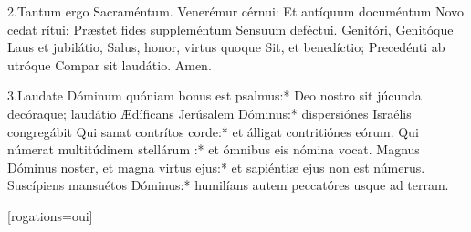 \documentclass[%
fontsize=11%
,a5paper%
,DIV=15%
]{scrartcl}
\title{\centrer{\huge{Procession des Rogations}}}
\def\gretextformat#1{{\fontsize{\taillepolice}{\taillepolice}\selectfont #1}}
\def\greinitialformat#1{{\lettrines #1}}
\begin{document}

{2.Tantum ergo Sacraméntum.
Venerémur cérnui:
Et antíquum documéntum
Novo cedat rítui:
Præstet fides suppleméntum
Sensuum deféctui.
Genitóri, Genitóque
Laus et jubilátio,
Salus, honor, virtus quoque
Sit, et benedíctio;
Precedénti ab utróque
Compar sit laudátio. Amen.}

{3.Laudate Dóminum quóniam bonus est
psalmus:* Deo nostro sit júcunda decóraque;
laudátio
Ædíficans Jerúsalem Dóminus:* dispersiónes
Israélis congregábit
Qui sanat contrítos corde:* et álligat contritiónes
eórum.
Qui númerat multitúdinem stellárum :* et
ómnibus eis nómina vocat.
Magnus Dóminus noster, et magna virtus ejus:*
et sapiéntiæ ejus non est númerus.
Suscípiens mansuétos Dóminus:* humilíans
autem peccatóres usque ad terram.}

\maketitle
\thispagestyle{empty}
\pageblanche

        \newfontfamily{}
            \def\gretextformat#1{{\fontsize{\taillepolice}{\taillepolice}\selectfont #1}}
            \def\greinitialformat#1{{\lettrines #1}}

\newkeycommand{\litanies}[rogations=oui]{
}
\litanies[rogations=oui]{}
\end{document}
